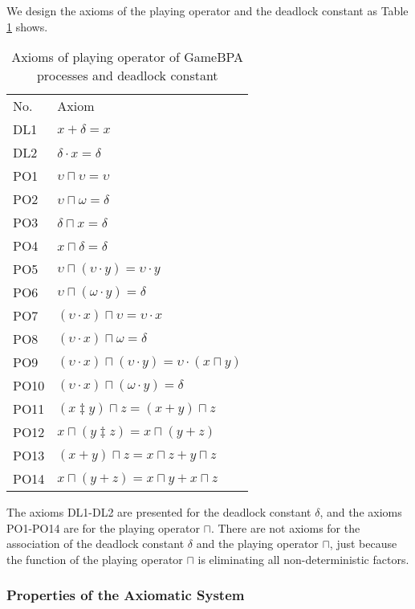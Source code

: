 \documentclass{fac}
\begin{document}
We design the axioms of the playing operator and the deadlock constant as Table \ref{AxiomOfPO} shows.

\begin{center}
\begin{table}
  \begin{tabular}{@{}ll@{}}
\hline No. &Axiom\\
  DL1 & $x + \delta = x$\\
  DL2 & $\delta\cdot x = \delta$\\
  PO1 & $\upsilon \sqcap \upsilon = \upsilon$ \\
  PO2 & $\upsilon \sqcap \omega = \delta$ \\
  PO3 & $\delta \sqcap x = \delta$ \\
  PO4 & $x \sqcap \delta = \delta$ \\
  PO5 & $\upsilon \sqcap (\upsilon\cdot y) = \upsilon\cdot y$ \\
  PO6 & $\upsilon \sqcap (\omega\cdot y) = \delta$\\
  PO7 & $(\upsilon \cdot x)\sqcap \upsilon = \upsilon\cdot x$\\
  PO8 & $(\upsilon \cdot x)\sqcap \omega = \delta$\\
  PO9 & $(\upsilon \cdot x)\sqcap (\upsilon\cdot y) = \upsilon\cdot(x\sqcap y)$\\
  PO10 & $(\upsilon \cdot x)\sqcap (\omega\cdot y) = \delta$\\
  PO11 & $(x\ddagger y)\sqcap z = (x + y)\sqcap z$\\
  PO12 & $x\sqcap (y\ddagger z) = x\sqcap (y + z)$\\
  PO13 & $(x+ y)\sqcap z = x\sqcap z + y\sqcap z$\\
  PO14 & $x\sqcap (y + z) = x\sqcap y + x\sqcap z$\\
\end{tabular}
\caption{Axioms of playing operator of GameBPA processes and deadlock constant}
\label{AxiomOfPO}
\end{table}
\end{center}

The axioms DL1-DL2 are presented for the deadlock constant $\delta$, and the axioms PO1-PO14 are for the playing operator $\sqcap$. There are not axioms for the association of the deadlock constant $\delta$ and the playing operator $\sqcap$, just because the function of the playing operator $\sqcap$ is eliminating all non-deterministic factors.

\subsubsection{Properties of the Axiomatic System}
\end{document}
